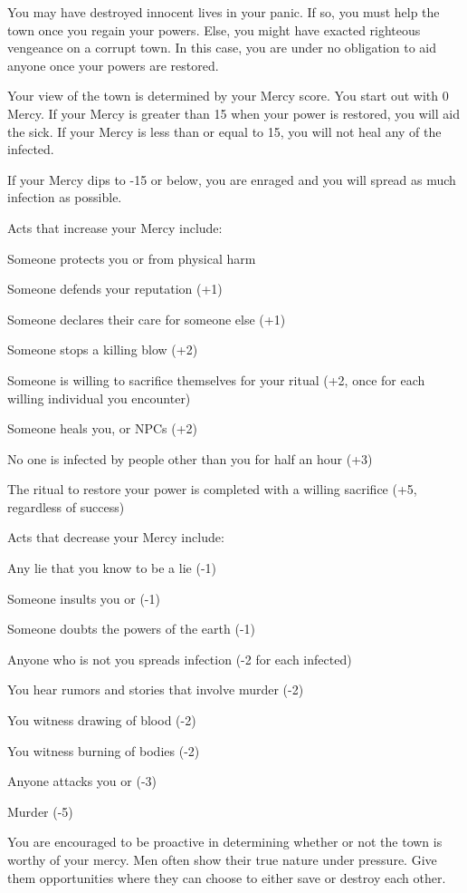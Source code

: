 \documentclass[green]{guildcamp4}
\begin{document}
\name{\gMercy{}}

You may have destroyed innocent lives in your panic. If so, you must help the town once you regain your powers. Else, you might have exacted righteous vengeance on a corrupt town. In this case, you are under no obligation to aid anyone once your powers are restored.

Your view of the town is determined by your Mercy score. You start out with 0 Mercy. If your Mercy is greater than 15 when your power is restored, you will aid the sick. If your Mercy is less than or equal to 15, you will not heal any of the infected. 

If your Mercy dips to -15 or below, you are enraged and you will spread as much infection as possible.

Acts that increase your Mercy include:

\begin{itemz}
	\item Someone protects you or \cShaman{} from physical harm
	\item Someone defends your reputation (+1)
	\item Someone declares their care for someone else (+1)
	\item Someone stops a killing blow (+2)
	\item Someone is willing to sacrifice themselves for your ritual (+2, once for each willing individual you encounter)
	\item Someone heals you, \cShaman{} or NPCs (+2)
	\item No one is infected by people other than you for half an hour (+3)
	\item The ritual to restore your power is completed with a willing sacrifice (+5, regardless of success)
\end{itemz}

Acts that decrease your Mercy include:

\begin{itemz}
	\item Any lie that you know to be a lie (-1)
	\item Someone insults you or \cShaman{} (-1)
	\item Someone doubts the powers of the earth (-1)
	\item Anyone who is not you spreads infection (-2 for each infected)
	\item You hear rumors and stories that involve murder (-2)
	\item You witness drawing of blood (-2)
	\item You witness burning of bodies (-2)
	\item Anyone attacks you or \cShaman{} (-3)
	\item Murder (-5)
\end{itemz}

You are encouraged to be proactive in determining whether or not the town is worthy of your mercy. Men often show their true nature under pressure. Give them opportunities where they can choose to either save or destroy each other.
\end{document}
